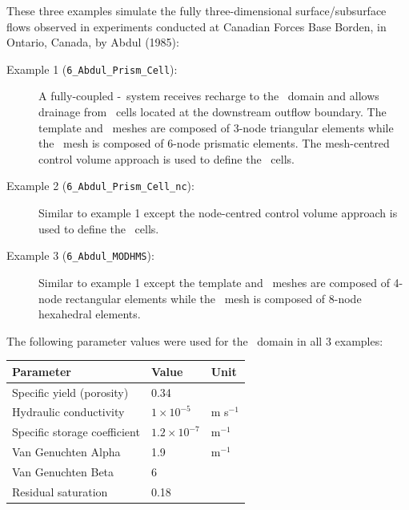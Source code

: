 \label{section:3D_Example_Abdul}
These three examples simulate the fully three-dimensional surface/subsurface flows observed in  experiments conducted at Canadian Forces Base Borden, in Ontario, Canada, by Abdul (1985):
\begin{description}
    \item [Example 1 (\texttt{6\_Abdul\_Prism\_Cell}):] A fully-coupled \gwf-\swf\ system receives recharge to the \swf\ domain and allows drainage from \swf\ cells located at the downstream outflow boundary.
        The template and \swf\ meshes are composed of 3-node triangular elements while the \gwf\ mesh is composed of 6-node prismatic elements.  The mesh-centred control volume approach is used to define the \mfus\ cells.
    \item [Example 2 (\texttt{6\_Abdul\_Prism\_Cell\_nc}):] Similar to example 1 except the node-centred control volume approach is used to define the \mfus\ cells.
    \item [Example 3 (\texttt{6\_Abdul\_MODHMS}):] Similar to example 1 except the template and \swf\ meshes are composed of 4-node rectangular elements while the \gwf\ mesh is composed of 8-node hexahedral elements.
\end{description}

The following parameter values were used for the \gwf\ domain in all 3 examples:

\begin{center}
    \begin{tabular}{lll}  \hline
        Parameter                             & Value                       &     Unit                                \\ \hline
        Specific yield (porosity)             &  0.34                       &                   \\
        Hydraulic conductivity                &  $ 1 \times 10^{-5}$        &     m s$^{-1}$    \\
        Specific storage coefficient          &  $ 1.2 \times 10^{-7}$      &     m$^{-1}$      \\
        Van Genuchten Alpha                   &  1.9                        &     m$^{-1}$      \\
        Van Genuchten Beta                    &  6                          &                   \\
        Residual saturation                   &  0.18                     &                   \\
    \hline
    \end{tabular}
\end{center}

